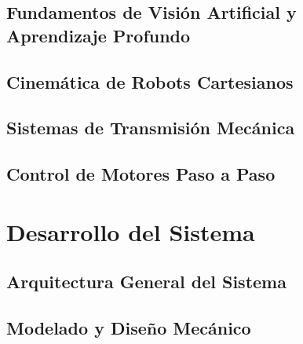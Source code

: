 \documentclass[a4paper,12pt]{report}
\begin{document}
\section{Fundamentos de Visión Artificial y Aprendizaje Profundo}



%

\section{Cinemática de Robots Cartesianos}




\section{Sistemas de Transmisión Mecánica}


\section{Control de Motores Paso a Paso}




\chapter{Desarrollo del Sistema}

\section{Arquitectura General del Sistema}





\section{Modelado y Diseño Mecánico}
\end{document}
